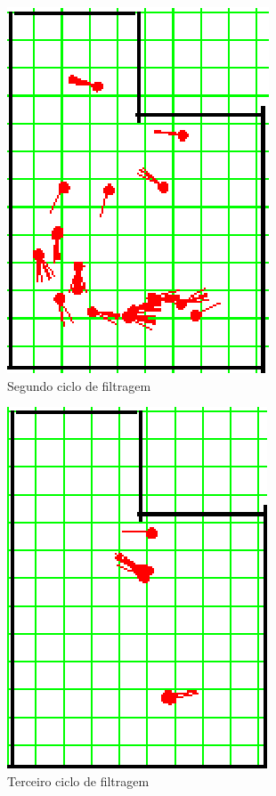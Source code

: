\begin{figure}[H]
  \centering
  \includegraphics[scale=1]{figuras/cen2_ex2/3.eps}
  \caption[Segundo Ciclo de Filtragem]{Segundo ciclo de filtragem}
  \label{img:cen2_ex2_3}
\end{figure}

\begin{figure}[H]
  \centering
  \includegraphics[scale=1]{figuras/cen2_ex2/4.eps}
  \caption[Terceiro Ciclo de Filtragem]{Terceiro ciclo de filtragem}
  \label{img:cen2_ex2_4}
\end{figure}

